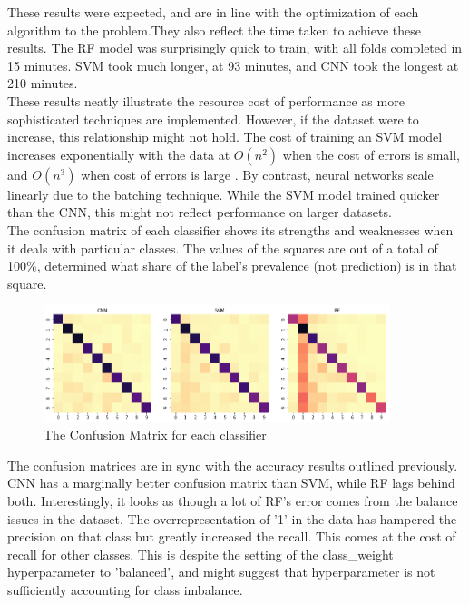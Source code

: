 \documentclass[11pt]{article}
\begin{document}
These results were expected, and are in line with the optimization of each algorithm to the problem.They also reflect the time taken to achieve these results. The RF model was surprisingly quick to train, with all folds completed in 15 minutes. SVM took much longer, at 93 minutes, and CNN took the longest at 210 minutes.\\

These results neatly illustrate the resource cost of performance as more sophisticated techniques are implemented. However, if the dataset were to increase, this relationship might not hold. The cost of training an SVM model increases exponentially with the data at $O(n^2)$ when the cost of errors is small, and $O(n^3)$ when cost of errors is large \citep{algoperformance}. By contrast, neural networks scale linearly due to the batching technique. While the SVM model trained quicker than the CNN, this might not reflect performance on larger datasets.\\

The confusion matrix of each classifier shows its strengths and weaknesses when it deals with particular classes. The values of the squares are out of a total of 100\%, determined what share of the label's prevalence (not prediction) is in that square.\\
\begin{figure}[h]
\caption{The Confusion Matrix for each classifier}
\centering
\includegraphics[width=0.9\textwidth]{images/cm_all.png}
\end{figure}

The confusion matrices are in sync with the accuracy results outlined previously. CNN has a marginally better confusion matrix than SVM, while RF lags behind both. Interestingly, it looks as though a lot of RF's error comes from the balance issues in the dataset. The overrepresentation of '1' in the data has hampered the precision on that class but greatly increased the recall. This comes at the cost of recall for other classes. This is despite the setting of the class\_weight hyperparameter to 'balanced', and might suggest that hyperparameter is not sufficiently accounting for class imbalance.\\
\end{document}
